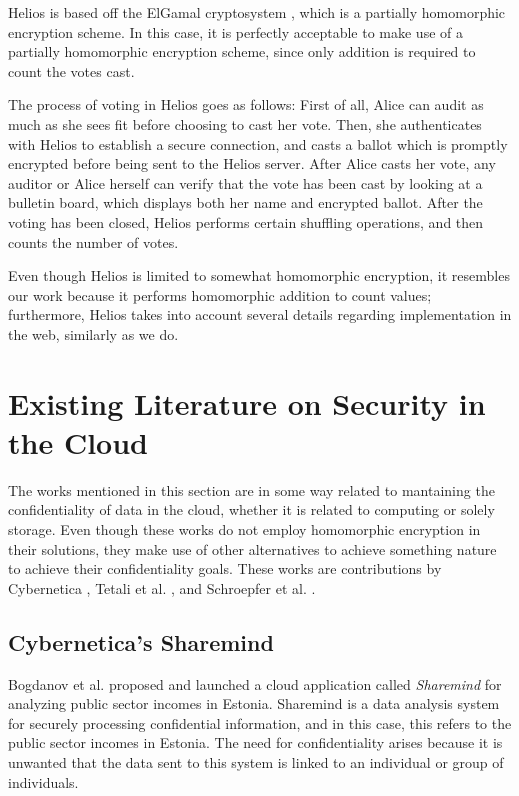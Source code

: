 Helios is based off the ElGamal cryptosystem \cite{ElGamal:1985:PKC:19478.19480}, which is a partially homomorphic encryption scheme. In this case, it is perfectly acceptable to make use of a partially homomorphic encryption scheme, since only addition is required to count the votes cast. 

The process of voting in Helios goes as follows: First of all, Alice can audit as much as she sees fit before choosing to cast her vote.  Then, she authenticates with Helios to establish a secure connection, and casts a ballot which is promptly encrypted before being sent to the Helios server. After Alice casts her vote, any auditor or Alice herself can verify that the vote has been cast by looking at a bulletin board, which displays both her name and encrypted ballot. After the voting has been closed, Helios performs certain shuffling operations, and then counts the number of votes.

Even though Helios is limited to somewhat homomorphic encryption, it resembles our work because it performs homomorphic addition to count values; furthermore, Helios takes into account several details regarding implementation in the web, similarly as we do.

\section{{Existing Literature on Security in the Cloud}}
The works mentioned in this section are in some way related to mantaining the confidentiality of data in the cloud, whether it is related to computing or solely storage. Even though these works do not employ homomorphic encryption in their solutions, they make use of other alternatives to achieve something nature to achieve their confidentiality goals. These works are contributions by Cybernetica \cite{ESORICS08:BLW08}, Tetali et al. \cite{Tetali:2013:MSA:2544173.2509554}, and Schroepfer et al. \cite{Schroepfer:2011:DSC:2046707.2093509}.

\subsection{Cybernetica's Sharemind}
Bogdanov et al. \cite{ESORICS08:BLW08} proposed and launched a cloud application called \emph{Sharemind} for analyzing public sector incomes in Estonia. Sharemind is a data analysis system for securely processing confidential information, and in this case, this refers to the public sector incomes in Estonia. The need for confidentiality arises because it is unwanted that the data sent to this system is linked to an individual or group of individuals. 

